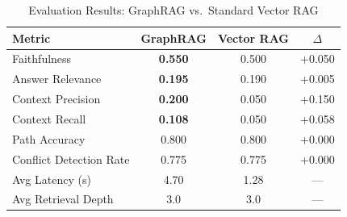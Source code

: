 \begin{table}[htbp]
\centering
\caption{Evaluation Results: GraphRAG vs.\ Standard Vector RAG}
\label{tab:evaluation}
\begin{tabular}{lccc}
\toprule
\textbf{Metric} & \textbf{GraphRAG} & \textbf{Vector RAG} & \textbf{$\Delta$} \\
\midrule
Faithfulness & \textbf{0.550} & 0.500 & +0.050 \\
Answer Relevance & \textbf{0.195} & 0.190 & +0.005 \\
Context Precision & \textbf{0.200} & 0.050 & +0.150 \\
Context Recall & \textbf{0.108} & 0.050 & +0.058 \\
Path Accuracy & 0.800 & 0.800 & +0.000 \\
Conflict Detection Rate & 0.775 & 0.775 & +0.000 \\
\midrule
Avg Latency (s) & 4.70 & 1.28 & — \\
Avg Retrieval Depth & 3.0 & 3.0 & — \\
\bottomrule
\end{tabular}
\end{table}